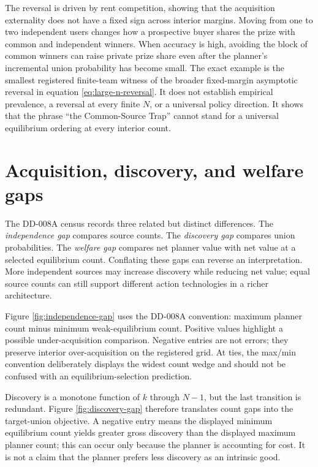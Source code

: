 \documentclass[11pt]{article}
\begin{document}
The reversal is driven by rent competition, showing that the acquisition
externality does not have a fixed sign across interior margins. Moving from one
to two independent users changes how a prospective buyer shares the prize with
common and independent winners. When accuracy is
high, avoiding the block of common winners can raise private prize share even
after the planner's incremental union probability has become small. The exact
example is the smallest registered finite-team witness of the broader
fixed-margin asymptotic reversal in equation \eqref{eq:large-n-reversal}. It
does not establish empirical prevalence, a reversal at every finite $N$, or a
universal policy direction. It shows that the phrase ``the Common-Source Trap''
cannot stand for a universal equilibrium ordering at every interior count.

\section{Acquisition, discovery, and welfare gaps}

The DD-008A census records three related but distinct differences. The
\emph{independence gap} compares source counts. The \emph{discovery gap}
compares union probabilities. The \emph{welfare gap} compares net planner value
with net value at a selected equilibrium count. Conflating these gaps can reverse
an interpretation. More independent sources may increase discovery while
reducing net value; equal source counts can still support different action
technologies in a richer architecture.



Figure \ref{fig:independence-gap} uses the DD-008A convention: maximum planner
count minus minimum weak-equilibrium count. Positive values highlight a possible
under-acquisition comparison. Negative entries are not errors; they preserve
interior over-acquisition on the registered grid. At ties, the max/min convention
deliberately displays the widest count wedge and should not be confused with an
equilibrium-selection prediction.



Discovery is a monotone function of $k$ through $N-1$, but the last transition
is redundant. Figure \ref{fig:discovery-gap} therefore translates count gaps
into the target-union objective. A negative entry means the displayed minimum
equilibrium count yields greater gross discovery than the displayed maximum
planner count; this can occur only because the planner is accounting for cost.
It is not a claim that the planner prefers less discovery as an intrinsic good.
\end{document}
